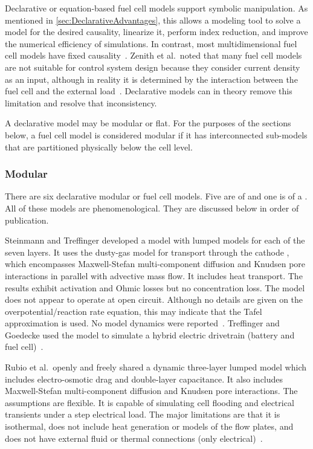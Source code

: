 Declarative or equation-based fuel cell models support symbolic manipulation.  As mentioned in \autoref{sec:DeclarativeAdvantages}, this allows a modeling tool to solve a model for the desired causality, linearize it, perform index reduction, and improve the numerical efficiency of simulations.  In contrast, most multidimensional fuel cell models have fixed causality~\cite{Meng2005}.  Zenith et al.\ noted that many fuel cell models are not suitable for control system design because they consider current density as an input, although in reality it is determined by the interaction between the fuel cell and the external load~\cite{Zenith2006}.  Declarative models can in theory remove this limitation and resolve that inconsistency.

A declarative model may be modular or flat.  For the purposes of the sections below, a fuel cell model is considered modular if it has interconnected sub-models that are partitioned physically below the cell level.


\subsubsection{Modular}

There are six declarative modular or  fuel cell models.  Five are of  and one is of a .  All of these models are phenomenological.  They are discussed below in order of publication.

Steinmann and Treffinger developed a  model with lumped models for each of the seven layers.  It uses the dusty-gas model for transport through the cathode , which encompasses Maxwell-Stefan multi-component diffusion and Knudsen pore interactions in parallel with advective mass flow.  It includes heat transport.  The results exhibit activation and Ohmic losses but no concentration loss.  The model does not appear to operate at open circuit.  Although no details are given on the overpotential\slash{}reaction rate equation, this may indicate that the Tafel approximation is used.  No model dynamics were reported~\cite{Steinmann2000}.  Treffinger and Goedecke used the model to simulate a hybrid electric drivetrain (battery and fuel cell)~\cite{Treffinger2002}.

Rubio et al.\ openly and freely shared a dynamic three-layer lumped  model which includes electro-osmotic drag and double-layer capacitance.  It also includes Maxwell-Stefan multi-component diffusion and Knudsen pore interactions.  The assumptions are flexible.  It is capable of simulating cell flooding and electrical transients under a step electrical load.  The major limitations are that it is isothermal, does not include heat generation or models of the flow plates, and does not have external fluid or thermal connections (only electrical)~\cite{Rubio2005, Rubio2009, Rubio2010}.

